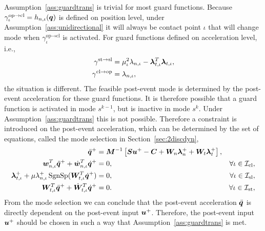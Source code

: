 \documentclass[../DC2017114Bouma.tex]{subfiles}
\begin{document}
\begin{myremark}
Assumption~\ref{ass:guardtrans} is trivial for most guard functions. Because $\gamma^{\text{op}\rightarrow\text{cl}}_{\iota} = h_{n,\iota}({\boldsymbol{q}})$ is defined on position level, under Assumption~\ref{ass:unidirectional} it will always be contact point $\iota$ that will change mode when $\gamma^{\text{op}\rightarrow\text{cl}}_{\iota}$ is activated. For guard functions defined on acceleration level, i.e.,
\begin{align*}
\gamma^{\textnormal{st}\rightarrow\textnormal{sl}} &= \mu_\iota^2\lambda_{n,\iota} - \boldsymbol{\lambda}^T_{t,\iota}\boldsymbol{\lambda}_{t,\iota},\\
\gamma^{\textnormal{cl}\rightarrow\textnormal{op}} &= \lambda_{n,\iota},
\end{align*}
the situation is different. The feasible post-event mode is determined by the post-event acceleration for these guard functions. It is therefore possible that a guard function is activated in mode $s^{k-1}$, but is inactive in mode $s^{k}$. Under Assumption~\ref{ass:guardtrans} this is not possible. Therefore a constraint is introduced on the post-event acceleration, which can be determined by the set of equations, called the mode selection in Section~\ref{sec:2discdyn},
\begin{align}
\ddot{{\boldsymbol{q}}}^+ &= {\boldsymbol{M}}^{-1}\left[{\boldsymbol{S}}{\boldsymbol{u}}^+ - {\boldsymbol{C}} + {\boldsymbol{W}}_{n}\boldsymbol{\lambda}^+_{n} + {\boldsymbol{W}}_{t}\boldsymbol{\lambda}^+_{t}\right], &  \nonumber\\
{\boldsymbol{w}}^T_{n,\iota}\ddot{{\boldsymbol{q}}}^+ + \dot{{\boldsymbol{w}}}^T_{n,\iota}\dot{{\boldsymbol{q}}}^+ &= 0, & \forall \iota\in\mathcal{I}_{\text{cl}},\nonumber\\
\boldsymbol{\lambda}^+_{t,\iota} + \mu\lambda^+_{n,\iota}\operatorname{\text{SgnSp}}({\boldsymbol{W}}_{t,\iota}^T\dot{{\boldsymbol{q}}}^+) &= 0, & \forall \iota\in\mathcal{I}_{\text{sl}},\nonumber\\
{\boldsymbol{W}}^T_{t,\iota}\ddot{{\boldsymbol{q}}}^+ + \dot{{\boldsymbol{W}}}^T_{t,\iota}\dot{{\boldsymbol{q}}}^+ &= 0. & \forall \iota\in\mathcal{I}_{\text{st}},\nonumber
\end{align}
From the mode selection we can conclude that the post-event acceleration $\ddot{{\boldsymbol{q}}}$ is directly dependent on the post-event input ${\boldsymbol{u}}^+$. Therefore, the post-event input ${\boldsymbol{u}}^+$ should be chosen in such a way that Assumption~\ref{ass:guardtrans} is met.
\end{myremark}
\end{document}
